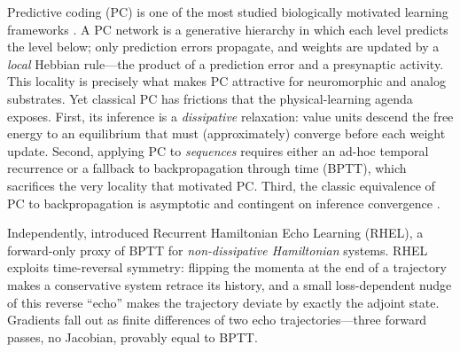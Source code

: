 \documentclass[10pt]{article}
\theoremstyle{remark}
\begin{document}
Predictive coding (PC) is one of the most studied biologically motivated
learning frameworks \citep{raoballard,whittingtonbogacz}. A PC network is a
generative hierarchy in which each level predicts the level below; only
prediction errors propagate, and weights are updated by a \emph{local} Hebbian
rule---the product of a prediction error and a presynaptic activity. This
locality is precisely what makes PC attractive for neuromorphic and analog
substrates. Yet classical PC has frictions that the physical-learning agenda
exposes. First, its inference is a \emph{dissipative} relaxation: value units
descend the free energy to an equilibrium that must (approximately) converge
before each weight update. Second, applying PC to \emph{sequences} requires
either an ad-hoc temporal recurrence or a fallback to backpropagation through
time (BPTT), which sacrifices the very locality that motivated PC. Third, the
classic equivalence of PC to backpropagation is asymptotic and contingent on
inference convergence \citep{whittingtonbogacz,millidge_review}.

Independently, \citet{rhel} introduced Recurrent Hamiltonian Echo Learning
(RHEL), a forward-only proxy of BPTT for \emph{non-dissipative Hamiltonian}
systems. RHEL exploits time-reversal symmetry: flipping the momenta at the
end of a trajectory makes a conservative system retrace its history, and a
small loss-dependent nudge of this reverse ``echo'' makes the trajectory
deviate by exactly the adjoint state. Gradients fall out as finite
differences of two echo trajectories---three forward passes, no Jacobian,
provably equal to BPTT.
\end{document}
